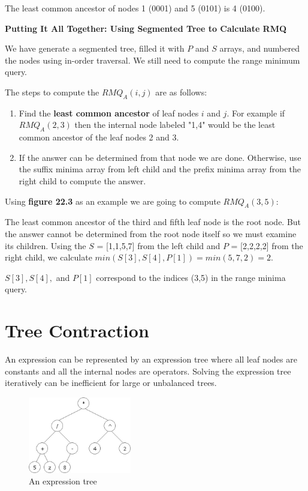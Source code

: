 \documentclass[twoside]{article}
\begin{document}
The least common ancestor of nodes 1 (0001) and 5 (0101) is 4 (0100).

\hspace{5pt}

{\large \textbf{Putting It All Together: Using Segmented Tree to Calculate RMQ}}

We have generate a segmented tree, filled it with $P$ and $S$ arrays, and numbered the nodes using in-order traversal.  We still need to compute the range minimum query.

The steps to compute the $RMQ_{A}(i,j)$ are as follows:

\begin{enumerate}
    \item Find the \textbf{least common ancestor} of leaf nodes $i$ and $j$.  For example if $RMQ_{A}(2,3)$ then the internal node labeled "1,4" would be the least common ancestor of the leaf nodes 2 and 3.
    \item If the answer can be determined from that node we are done. Otherwise, use the suffix minima array from left child and the prefix minima array from the right child to compute the answer.
\end{enumerate}

Using \textbf{figure 22.3} as an example we are going to compute $RMQ_{A}(3,5)$:

The least common ancestor of the third and fifth leaf node is the root node.  But the answer cannot be determined from the root node itself so we must examine its children.  Using the $S$ = [1,1,5,7] from the left child and $P$ = [2,2,2,2] from the right child, we calculate $min(S[3], S[4], P[1]) = min(5, 7, 2) = 2$. 

$S[3], S[4],$ and $P[1]$ correspond to the indices (3,5) in the range minima query.



\section{Tree Contraction}

An expression can be represented by an expression tree where all leaf nodes are constants and all the internal nodes are operators.  Solving the expression tree iteratively can be inefficient for large or unbalanced trees.

\begin{figure}[h]
  \begin{center}
    \includegraphics[width=0.4\textwidth]{exptree.JPG}
  \end{center}
  \caption{An expression tree}
\end{figure}
\end{document}
